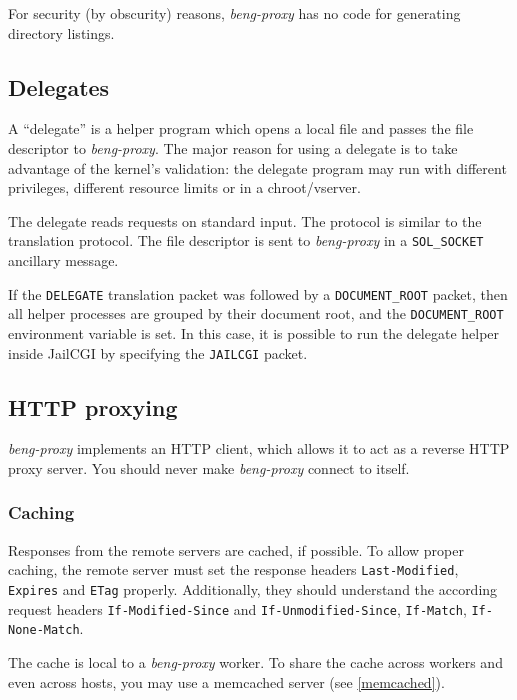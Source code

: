 \documentclass[a4paper,12pt]{article}
\begin{document}
For security (by obscurity) reasons, \emph{beng-proxy} has no code for
generating directory listings.

\subsection{Delegates}
\label{delegate}

A ``delegate'' is a helper program which opens a local file and passes
the file descriptor to \emph{beng-proxy}.  The major reason for using
a delegate is to take advantage of the kernel's validation: the
delegate program may run with different privileges, different resource
limits or in a chroot/vserver.

The delegate reads requests on standard input.  The protocol is
similar to the translation protocol.  The file descriptor is sent to
\emph{beng-proxy} in a \texttt{SOL\_SOCKET} ancillary message.

If the \texttt{DELEGATE} translation packet was followed by a
\texttt{DOCUMENT\_ROOT} packet, then all helper processes are grouped
by their document root, and the \texttt{DOCUMENT\_ROOT} environment
variable is set.  In this case, it is possible to run the delegate
helper inside JailCGI by specifying the \texttt{JAILCGI} packet.

\subsection{HTTP proxying}
\label{http}

\emph{beng-proxy} implements an HTTP client, which allows it to act as
a reverse HTTP proxy server.  You should never make \emph{beng-proxy}
connect to itself.

\subsubsection{Caching}
\label{caching}

Responses from the remote servers are cached, if possible.  To allow
proper caching, the remote server must set the response headers
\texttt{Last-Modified}, \texttt{Expires} and \texttt{ETag} properly.
Additionally, they should understand the according request headers
\texttt{If-Modified-Since} and \texttt{If-Unmodified-Since},
\texttt{If-Match}, \texttt{If-None-Match}.

The cache is local to a \emph{beng-proxy} worker.  To share the cache
across workers and even across hosts, you may use a memcached server
(see \ref{memcached}).
\end{document}

